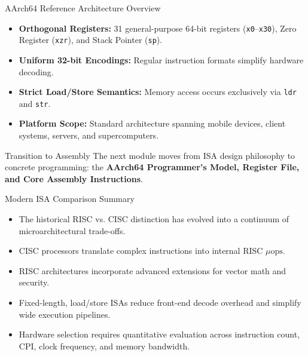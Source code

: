\documentclass[aspectratio=169,11pt,t]{beamer}
\newcommand{\key}[1]{\textbf{#1}}
\newcommand{\bits}[1]{\texttt{#1}}
\begin{document}

\begin{frame}{AArch64 Reference Architecture Overview}
\large
\begin{itemize}\setlength{\itemsep}{7pt}
  \item \key{Orthogonal Registers:} 31 general-purpose 64-bit registers (\bits{x0}--\bits{x30}), Zero Register (\bits{xzr}), and Stack Pointer (\bits{sp}).
  \item \key{Uniform 32-bit Encodings:} Regular instruction formats simplify hardware decoding.
  \item \key{Strict Load/Store Semantics:} Memory access occurs exclusively via \bits{ldr} and \bits{str}.
  \item \key{Platform Scope:} Standard architecture spanning mobile devices, client systems, servers, and supercomputers.
\end{itemize}

\vspace{0.3cm}
\normalsize
\begin{block}{Transition to Assembly}
The next module moves from ISA design philosophy to concrete programming: the \key{AArch64 Programmer's Model, Register File, and Core Assembly Instructions}.
\end{block}
\end{frame}


\begin{frame}{Modern ISA Comparison Summary}
\large
\begin{itemize}\setlength{\itemsep}{8pt}
  \item The historical RISC vs. CISC distinction has evolved into a continuum of microarchitectural trade-offs.
  \item CISC processors translate complex instructions into internal RISC $\mu\text{ops}$.
  \item RISC architectures incorporate advanced extensions for vector math and security.
  \item Fixed-length, load/store ISAs reduce front-end decode overhead and simplify wide execution pipelines.
  \item Hardware selection requires quantitative evaluation across instruction count, CPI, clock frequency, and memory bandwidth.
\end{itemize}
\end{frame}
\end{document}
